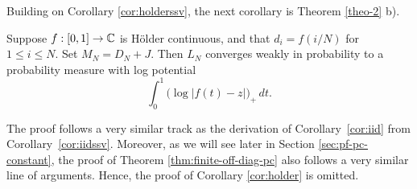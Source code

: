 \documentclass{amsart}
\numberwithin{equation}{section}
\def\corEE{\textcolor{amethyst}}
\def\corEE{}
\def\corAB{}
\begin{document}
 Building on
    Corollary \ref{cor:holderssv}, the next
 corollary is Theorem \ref{theo-2} b).
 \begin{corollary}
   \label{cor:holder}
Suppose $f : [0,1] \to \mathbb{C}$ is H\"older continuous,
    and that $d_i = f(i/N)$ for $1 \leq i \leq N.$
    Set $M_N=D_N+J$. Then
   \corAB{$L_N$} converges weakly in probability to a probability
   measure with log potential
   \[
     \int_0^1 \bigl(\log |f(t)-z|\bigr)_+\,dt.
   \]
  \end{corollary}
  \corAB{The proof
    follows a very similar track as the
    derivation of Corollary~\ref{cor:iid} from Corollary~\ref{cor:iidssv}. Moreover, as we will see later in Section \ref{sec:pf-pc-constant}, the proof of Theorem \ref{thm:finite-off-diag-pc} \corEE{also follows a very similar line of arguments}. Hence, the proof of Corollary \ref{cor:holder} is omitted.}

\end{document}

